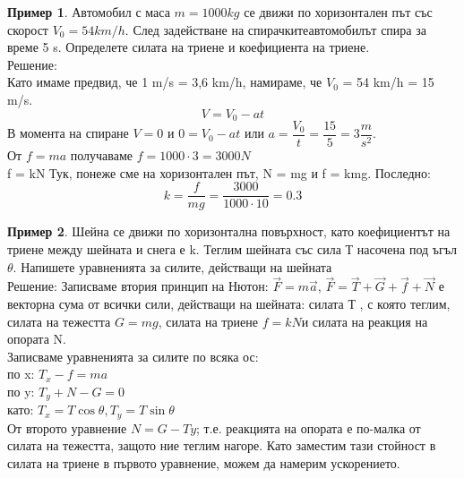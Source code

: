 \documentclass[fleqn, 12pt]{article}
\theoremstyle{definition}
\newtheorem{example}{Пример}[subsection]
\begin{document}
\begin{example}
Автомобил с маса $m = 1000 kg$ се движи по хоризонтален път със скорост $V_0 = 54 km/h$. След задействане на спирачкитеавтомобилът спира за време 5 s. Определете силата на триене и коефициента на триене.\\
Решение: \\
Като имаме предвид, че 1 m/s = 3,6 km/h, намираме, че $V_0$ = 54 km/h = 15 m/s. \\
$$V = V_0 - at$$
В момента на спиране $V = 0$ и $0 = V_0 - at$ или $a = \dfrac{V_0}{t} = \dfrac{15}{5} = 3 \dfrac{m}{s^2}. $\\
От $f = ma$ получаваме $f =1000 \cdot 3 = 3000 N$ \\
f = kN Тук, понеже сме на хоризонтален път, N = mg и f = kmg. Последно:
$$k = \dfrac{f}{mg} = \dfrac{3000}{1000 \cdot 10} = 0.3$$
\end{example}

\begin{example}
Шейна се движи по хоризонтална повърхност, като коефициентът на триене между шейната и снега е k. Теглим шейната със сила Т насочена под ъгъл $\theta$. Напишете уравненията за силите, действащи на шейната \\
Решение: 
Записваме втория принцип на Нютон: $\vec{F} = m \vec{a}$, $\vec{F} = \vec{T} + \vec{G} + \vec{f} + \vec{N}$ е векторна сума от всички сили, действащи на шейната: силата Т , с която теглим, силата на тежестта $G = mg$, силата на триене $f = kN$и силата на реакция на опората N. \\
Записваме уравненията за силите по всяка ос: \\
по x: $T_x - f = ma $\\
по y: $ T_y + N - G = 0$\\
като: $ T_x = T \cos{\theta}, T_y = T \sin{\theta}$ \\
От второто уравнение $N = G - Ty$; т.е. реакцията на опората е по-малка от силата на тежестта, защото ние теглим нагоре. Като заместим тази стойност в силата на триене в първото уравнение, можем да намерим ускорението.
\end{example}
\end{document}
